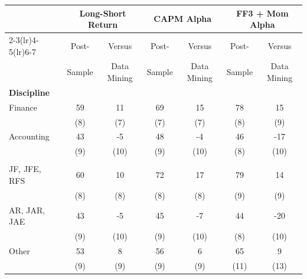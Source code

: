 \begin{tabular}{lcccccc}
   \toprule
   & \multicolumn{2}{c}{Long-Short Return} & \multicolumn{2}{c}{CAPM Alpha} & \multicolumn{2}{c}{FF3 + Mom Alpha} \\
   \cmidrule(lr){2-3}\cmidrule(lr){4-5}\cmidrule(lr){6-7}
   & Post- & \multicolumn{1}{c}{Versus} & Post- & \multicolumn{1}{c}{Versus} & Post- & \multicolumn{1}{c}{Versus} \\
   & Sample & \multicolumn{1}{c}{Data Mining} & Sample & \multicolumn{1}{c}{Data Mining} & Sample & \multicolumn{1}{c}{Data Mining} \\
   \midrule
   \multicolumn{7}{l}{\textbf{Discipline}} \\
   Finance & 59 & 11 & 69 & 15 & 78 & 15 \\
   & (8) & (7) & (7) & (7) & (8) & (9) \\
   Accounting & 43 & -5 & 48 & -4 & 46 & -17 \\
   & (9) & (10) & (9) & (10) & (8) & (10) \\
   \addlinespace
   \multicolumn{7}{l}{\textbf{Journal Rank}} \\
   JF, JFE, RFS & 60 & 10 & 72 & 17 & 79 & 14 \\
   & (8) & (8) & (8) & (8) & (9) & (9) \\
   AR, JAR, JAE & 43 & -5 & 45 & -7 & 44 & -20 \\
   & (9) & (10) & (9) & (10) & (8) & (10) \\
   Other & 53 & 8 & 56 & 6 & 65 & 9 \\
   & (9) & (9) & (9) & (9) & (11) & (13) \\
   \bottomrule
\end{tabular}
